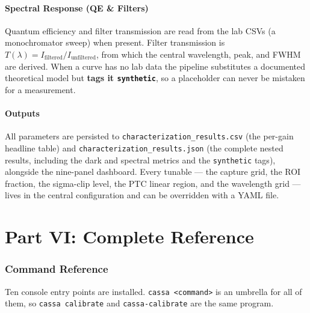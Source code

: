 \documentclass[11pt,a4paper]{article}
\begin{document}
\subsection{Spectral Response (QE \& Filters)}
Quantum efficiency and filter transmission are read from the lab CSVs (a monochromator sweep) when present. Filter transmission is $T(\lambda) = I_{\mathrm{filtered}}/I_{\mathrm{unfiltered}}$, from which the central wavelength, peak, and FWHM are derived. When a curve has no lab data the pipeline substitutes a documented theoretical model but \textbf{tags it \texttt{synthetic}}, so a placeholder can never be mistaken for a measurement.

\subsection{Outputs}
All parameters are persisted to \texttt{characterization\_results.csv} (the per-gain headline table) and \texttt{characterization\_results.json} (the complete nested results, including the dark and spectral metrics and the \texttt{synthetic} tags), alongside the nine-panel dashboard. Every tunable --- the capture grid, the ROI fraction, the sigma-clip level, the PTC linear region, and the wavelength grid --- lives in the central configuration and can be overridden with a YAML file.


\clearpage
\part*{Part VI: Complete Reference}

\section{Command Reference}
Ten console entry points are installed. \texttt{cassa <command>} is an umbrella
for all of them, so \texttt{cassa calibrate} and \texttt{cassa-calibrate} are the
same program.
\end{document}
